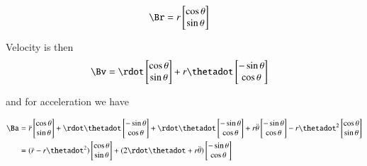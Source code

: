 \begin{align*}
\Br 
&= r 
\begin{bmatrix}
\cos\theta \\
\sin\theta
\end{bmatrix}
\end{align*}

Velocity is then
\begin{align*}
\Bv 
&= 
\rdot 
\begin{bmatrix}
\cos\theta \\
\sin\theta
\end{bmatrix}
+r \thetadot
\begin{bmatrix}
-\sin\theta \\
\cos\theta
\end{bmatrix}
\end{align*}

and for acceleration we have

\begin{align*}
\Ba 
&= 
\ddot{r}
\begin{bmatrix}
\cos\theta \\
\sin\theta
\end{bmatrix}
+\rdot \thetadot
\begin{bmatrix}
-\sin\theta \\
\cos\theta
\end{bmatrix}
+\rdot \thetadot
\begin{bmatrix}
-\sin\theta \\
\cos\theta
\end{bmatrix}
+r \ddot{\theta}
\begin{bmatrix}
-\sin\theta \\
\cos\theta
\end{bmatrix}
-r \thetadot^2
\begin{bmatrix}
\cos\theta \\
\sin\theta 
\end{bmatrix} \\
&=
(\ddot{r} -r \thetadot^2)
\begin{bmatrix}
\cos\theta \\
\sin\theta
\end{bmatrix}
+(2\rdot \thetadot +r \ddot{\theta})
\begin{bmatrix}
-\sin\theta \\
\cos\theta
\end{bmatrix}
\end{align*}
